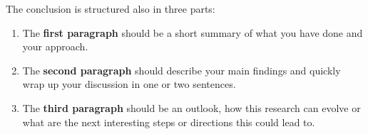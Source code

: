 The conclusion is structured also in three parts:

\begin{enumerate}
    \item The \textbf{first paragraph} should be a short summary of what you have done and your approach.
    \item The \textbf{second paragraph} should describe your main findings and quickly wrap up your discussion in one or two sentences. 
    \item The \textbf{third paragraph} should be an outlook, how this research can evolve or what are the next interesting steps or directions this could lead to. 
\end{enumerate}
